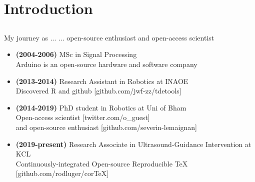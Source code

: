 \section{Introduction}

\subsection{}
{

\begin{frame}{My journey as ...}
... open-source enthusiast and open-access scientist
 
\begin{itemize}	
	\item 
	\textbf{(2004-2006)} MSc in Signal Processing \\
Arduino is an open-source hardware and software company
	\item \textbf{(2013-2014)} 
	Research Assistant in Robotics at INAOE \\
	Discovered R and github [github.com/jwf-zz/tdetools]
	\item \textbf{(2014-2019)} 
	PhD student in Robotics at Uni of Bham \\
		Open-access scientist [twitter.com/o\_guest] \\
		and 
		open-source enthusiast [github.com/severin-lemaignan] 
	\item \textbf{(2019-present)} 
	Research Associate in Ultrasound-Guidance 
	Intervention at KCL \\
		Continuously-integrated Open-source Reproducible TeX
	[github.com/rodluger/corTeX]
\end{itemize}

	
\end{frame}
}



